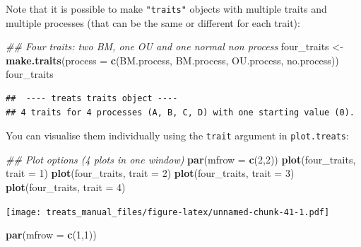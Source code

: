 \documentclass[
]{book}
\newenvironment{Shaded}{\begin{snugshade}}{\end{snugshade}}
\newcommand{\CommentTok}[1]{\textcolor[rgb]{0.56,0.35,0.01}{\textit{#1}}}
\newcommand{\DataTypeTok}[1]{\textcolor[rgb]{0.13,0.29,0.53}{#1}}
\newcommand{\DecValTok}[1]{\textcolor[rgb]{0.00,0.00,0.81}{#1}}
\newcommand{\KeywordTok}[1]{\textcolor[rgb]{0.13,0.29,0.53}{\textbf{#1}}}
\newcommand{\NormalTok}[1]{#1}
\newcommand{\StringTok}[1]{\textcolor[rgb]{0.31,0.60,0.02}{#1}}
\begin{document}
Note that it is possible to make \texttt{"traits"} objects with multiple traits and multiple processes (that can be the same or different for each trait):

\begin{Shaded}
\begin{Highlighting}[]
\CommentTok{\#\# Four traits: two BM, one OU and one normal non process}
\NormalTok{four\_traits \textless{}{-}}\StringTok{ }\KeywordTok{make.traits}\NormalTok{(}\DataTypeTok{process =} \KeywordTok{c}\NormalTok{(BM.process,}
\NormalTok{                                       BM.process,}
\NormalTok{                                       OU.process,}
\NormalTok{                                       no.process))}
\NormalTok{four\_traits}
\end{Highlighting}
\end{Shaded}

\begin{verbatim}
##  ---- treats traits object ---- 
## 4 traits for 4 processes (A, B, C, D) with one starting value (0).
\end{verbatim}

You can visualise them individually using the \texttt{trait} argument in \texttt{plot.treats}:

\begin{Shaded}
\begin{Highlighting}[]
\CommentTok{\#\# Plot options (4 plots in one window)}
\KeywordTok{par}\NormalTok{(}\DataTypeTok{mfrow =} \KeywordTok{c}\NormalTok{(}\DecValTok{2}\NormalTok{,}\DecValTok{2}\NormalTok{))}
\KeywordTok{plot}\NormalTok{(four\_traits, }\DataTypeTok{trait =} \DecValTok{1}\NormalTok{)}
\KeywordTok{plot}\NormalTok{(four\_traits, }\DataTypeTok{trait =} \DecValTok{2}\NormalTok{)}
\KeywordTok{plot}\NormalTok{(four\_traits, }\DataTypeTok{trait =} \DecValTok{3}\NormalTok{)}
\KeywordTok{plot}\NormalTok{(four\_traits, }\DataTypeTok{trait =} \DecValTok{4}\NormalTok{)}
\end{Highlighting}
\end{Shaded}

\texttt{[image: treats\_manual\_files/figure-latex/unnamed-chunk-41-1.pdf]}

\begin{Shaded}
\begin{Highlighting}[]
\KeywordTok{par}\NormalTok{(}\DataTypeTok{mfrow =} \KeywordTok{c}\NormalTok{(}\DecValTok{1}\NormalTok{,}\DecValTok{1}\NormalTok{))}
\end{Highlighting}
\end{Shaded}
\end{document}
